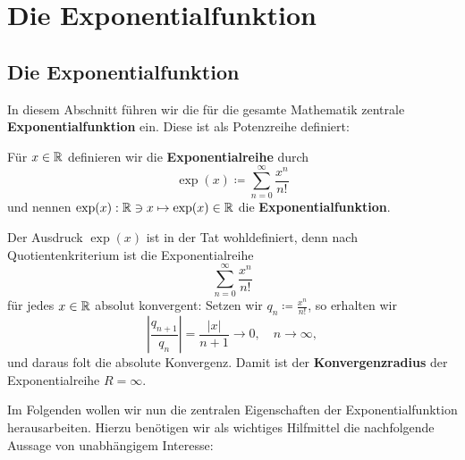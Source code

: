 \section{Die Exponentialfunktion}
\subsection{Die Exponentialfunktion}
In diesem Abschnitt führen wir die für die gesamte Mathematik zentrale \textbf{Exponentialfunktion} ein. Diese ist als Potenzreihe definiert:
\begin{subdefinition}
	Für $ x \in \mathbb{R}  $ definieren wir die \textbf{Exponentialreihe} durch
	\[
		\exp (x) \coloneqq \sum_{n=0}^{\infty} \frac{ x^{n} }{ n! } 
	\]
	und nennen $ \exp(x): \mathbb{R} \ni x \mapsto \exp (x) \in \mathbb{R}  $ die \textbf{Exponentialfunktion}.
\end{subdefinition}

Der Ausdruck $ \exp (x) $ ist in der Tat wohldefiniert, denn nach Quotientenkriterium ist die Exponentialreihe
\[
	\sum_{n=0}^{\infty} \frac{ x^{n} }{ n! } 
\]
für jedes $ x \in \mathbb{R}  $ absolut konvergent: Setzen wir $ q_n \coloneqq \frac{ x^{n} }{ n! }  $, so erhalten wir
\[
	\left| \frac{q_{n+1}}{ q_n }  \right| = \frac{ \left| x \right| }{ n + 1 } \to 0, \quad n \to \infty,
\]
und daraus folt die absolute Konvergenz. Damit ist der \textbf{Konvergenzradius} der Exponentialreihe $ R = \infty $.

Im Folgenden wollen wir nun die zentralen Eigenschaften der Exponentialfunktion herausarbeiten. Hierzu benötigen wir als wichtiges Hilfmittel die nachfolgende Aussage von unabhängigem Interesse:

